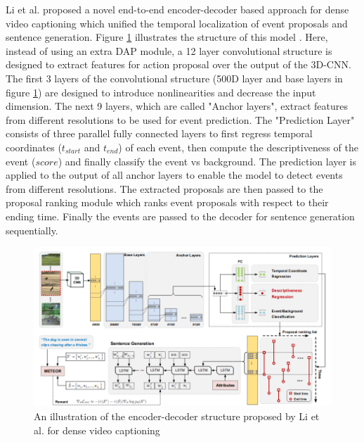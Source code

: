 \documentclass[preprint, 12pt]{elsarticle}
\begin{document}
		Li et al. \cite{li2018jointly} proposed a novel end-to-end encoder-decoder based approach for dense video captioning which unified the temporal localization of event proposals and sentence generation\cite{li2018jointly}. Figure \ref{fig:dense2} illustrates the structure of this model \cite{li2018jointly}. Here, instead of using an extra DAP module, a 12 layer convolutional structure is designed to extract features for action proposal over the output of the 3D-CNN. The first 3 layers of the convolutional structure (500D layer and base layers in figure \ref{fig:dense2}) are designed to introduce nonlinearities and decrease the input dimension. The next 9 layers, which are called "Anchor layers", extract features from different resolutions to be used for event prediction. The "Prediction Layer" consists of three parallel fully connected layers to first regress temporal coordinates ($t_{start}$ and $t_{end}$) of each event, then compute the descriptiveness of the event ($score$) and finally classify the event vs background. The prediction layer is applied to the output of all anchor layers to enable the model to detect events from different resolutions. The extracted proposals are then passed to the proposal ranking module which ranks event proposals with respect to their ending time. Finally the events are passed to the decoder for sentence generation sequentially.
		
		\begin{figure}[h]
			\centering
			\includegraphics[scale=0.5]{Imgs/dense2.png}
			\caption{An illustration of the encoder-decoder structure proposed by Li et al. for dense video captioning \cite{li2018jointly}}
			\label{fig:dense2}
		\end{figure}
	
\end{document}
